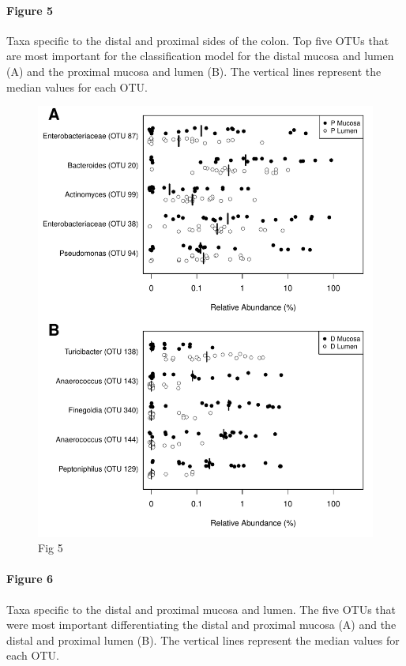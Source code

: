 \documentclass[12pt,]{article}
\let\oldparagraph\paragraph
\renewcommand{\paragraph}[1]{\oldparagraph{#1}\mbox{}}
\begin{document}
\paragraph{Figure 5}\label{figure-5}

Taxa specific to the distal and proximal sides of the colon. Top five
OTUs that are most important for the classification model for the distal
mucosa and lumen (A) and the proximal mucosa and lumen (B). The vertical
lines represent the median values for each OTU.

\begin{figure}[htbp]
\centering
\includegraphics{../submission/figure_5.pdf}
\caption{Fig 5}
\end{figure}

\newpage

\paragraph{Figure 6}\label{figure-6}

Taxa specific to the distal and proximal mucosa and lumen. The five OTUs
that were most important differentiating the distal and proximal mucosa
(A) and the distal and proximal lumen (B). The vertical lines represent
the median values for each OTU.
\end{document}

